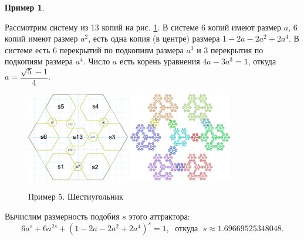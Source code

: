 \documentclass[a4paper,14pt]{extarticle} %
\newcommand{\0}{\varnothing}
\newcommand{\8}{\infty}
\theoremstyle{definition}
\newtheorem{example}{Пример}
\begin{document}
\begin{example}\label{ex:5}

Рассмотрим систему из 13 копий на рис. \ref{fig:primer5_скелет}.
В системе 6 копий имеют размер $a$, 6 копий имеют размер $a^2$, есть одна копия (в центре) размера $1-2a-2a^2+2a^4$.
В системе есть 6 перекрытий по подкопиям размера $a^3$ и 3 перекрытия по подкопиям размера $a^4$.
Число $a$ есть корень уравнения $4a-3a^3=1$, откуда $a=\dfrac{\sqrt{5}-1}{4}$.

\begin{figure}[H]
    \centering    
    \includegraphics[width=0.4\textwidth]{extreme_skel_pod.png}
    \hfill
    \includegraphics[width=0.4\textwidth]{den_six_3_2_4_3_full.png}
    \caption{Пример 5. Шестиугольник}
    \label{fig:primer5_скелет}
\end{figure}
Вычислим размерность подобия $s$ этого аттрактора:
$$6a^s+6a^{2s}+(1-2a-2a^2+2a^4)^s=1,\;\text{ откуда }\; s\approx1.69669525348048.$$


\end{example}
\end{document}
